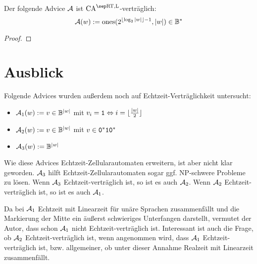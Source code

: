 \begin{satz}
    Der folgende Advice $\mathcal{A}$ ist $\CAM{\CART, \CALeft}$-verträglich:
    \[
        \mathcal{A}(w) := \mathrm{ones}(2^{\lfloor \log_2{|w|} \rfloor - 1}, |w|) \in \mathbb{B}^*
    \]
\end{satz}
\begin{proof}
    
\end{proof}

\section{Ausblick}

Folgende Advices wurden außerdem noch auf Echtzeit-Verträglichkeit untersucht:
\begin{itemize}
    \item $\mathcal{A}_1(w) := v \in \mathbb{B}^{|w|}$ mit $v_i = \texttt{1} \Leftrightarrow i = \lfloor \frac{|w|}{2} \rfloor$
    \item $\mathcal{A}_2(w) := v \in \mathbb{B}^{|w|}$ mit $v \in \texttt{0}^*\texttt{1}\texttt{0}^*$
    \item $\mathcal{A}_3(w) := \mathbb{B}^{|w|}$
\end{itemize}
Wie diese Advices Echtzeit-Zellularautomaten erweitern, ist aber nicht klar geworden.
$\mathcal{A}_3$ hilft Echtzeit-Zellularautomaten sogar \acs{ggf.} NP-schwere Probleme zu lösen.
Wenn $\mathcal{A}_3$ Echtzeit-verträglich ist, so ist es auch $\mathcal{A}_2$.
Wenn $\mathcal{A}_2$ Echtzeit-verträglich ist, so ist es auch $\mathcal{A}_1$.

Da bei $\mathcal{A}_1$ Echtzeit mit Linearzeit für unäre Sprachen zusammenfällt und die Markierung
der Mitte ein äußerst schwieriges Unterfangen darstellt, vermutet der Autor, dass schon $\mathcal{A}_1$ nicht
Echtzeit-verträglich ist.
Interessant ist auch die Frage, ob $\mathcal{A}_2$ Echtzeit-verträglich ist, wenn angenommen wird,
dass $\mathcal{A}_1$ Echtzeit-verträglich ist, \acs{bzw.} allgemeiner, ob unter dieser Annahme
Realzeit mit Linearzeit zusammenfällt.